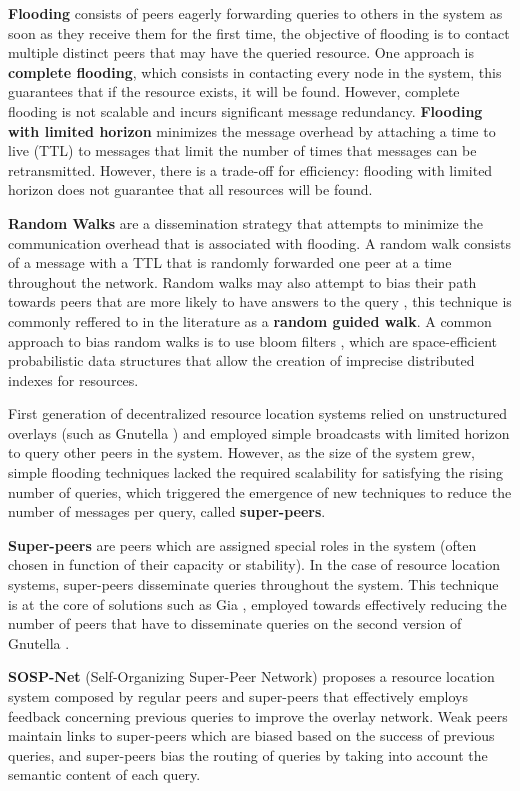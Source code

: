 \textbf{Flooding} consists of peers eagerly forwarding queries to others in the system as soon as they receive them for the first time, the objective of flooding is to contact multiple distinct peers that may have the queried resource. One approach is \textbf{complete flooding}, which consists in contacting every node in the system, this guarantees that if the resource exists, it will be found. However, complete flooding is not scalable and incurs significant message redundancy. \textbf{Flooding with limited horizon} minimizes the message overhead by attaching a time to live (TTL) to messages that limit the number of times that messages can be retransmitted. However, there is a trade-off for efficiency: flooding with limited horizon does not guarantee that all resources will be found. 

\textbf{Random Walks} are a dissemination strategy that attempts to minimize the communication overhead that is associated with flooding. A random walk consists of a message with a TTL that is randomly forwarded one peer at a time throughout the network. Random walks may also attempt to bias their path towards peers that are more likely to have answers to the query \cite{1022239}, this technique is commonly reffered to in the literature as a \textbf{random guided walk}. A common approach to bias random walks is to use bloom filters \cite{5751342}, which are space-efficient probabilistic data structures that allow the creation of imprecise distributed indexes for resources.

First generation of decentralized resource location systems relied on unstructured overlays (such as Gnutella \cite{gnutella_gtk}) and employed simple broadcasts with limited horizon to query other peers in the system. However, as the size of the system grew, simple flooding techniques lacked the required scalability for satisfying the rising number of queries, which triggered the emergence of new techniques to reduce the number of messages per query, called \textbf{super-peers}. 

\textbf{Super-peers} are peers which are assigned special roles in the system (often chosen in function of their capacity or stability). In the case of resource location systems, super-peers disseminate queries throughout the system. This technique is at the core of solutions such as Gia \cite{Chawathe2003}, employed towards effectively reducing the number of peers that have to disseminate queries on the second version of Gnutella \cite{gnutella_gtk}. 

\textbf{SOSP-Net} \cite{garbacki2007optimizing} (Self-Organizing Super-Peer Network) proposes a resource location system composed by regular peers and super-peers that effectively employs feedback concerning previous queries to improve the overlay network. Weak peers maintain links to super-peers which are biased based on the success of previous queries, and super-peers bias the routing of queries by taking into account the semantic content of each query. 

